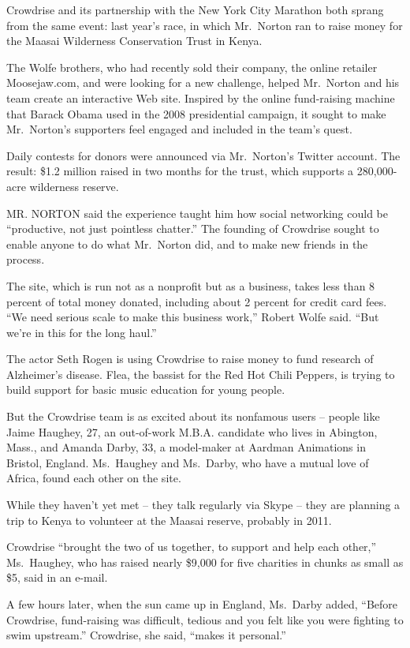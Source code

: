 ﻿\documentclass[12pt]{article}
\begin{document}
Crowdrise and its partnership with the New York City Marathon both sprang from the same event: last
year's race, in which Mr.~Norton ran to raise money for the Maasai Wilderness Conservation Trust in
Kenya.

The Wolfe brothers, who had recently sold their company, the online retailer Moosejaw.com, and were
looking for a new challenge, helped Mr.~Norton and his team create an interactive Web site. Inspired
by the online fund-raising machine that Barack Obama used in the 2008 presidential campaign, it
sought to make Mr.~Norton's supporters feel engaged and included in the team's quest.

Daily contests for donors were announced via Mr.~Norton's Twitter account. The result: \$1.2 million
raised in two months for the trust, which supports a 280,000-acre wilderness reserve.

MR. NORTON said the experience taught him how social networking could be ``productive, not just
pointless chatter.'' The founding of Crowdrise sought to enable anyone to do what Mr.~Norton did,
and to make new friends in the process.

The site, which is run not as a nonprofit but as a business, takes less than 8 percent of total
money donated, including about 2 percent for credit card fees. ``We need serious scale to make this
business work,'' Robert Wolfe said. ``But we're in this for the long haul.''

The actor Seth Rogen is using Crowdrise to raise money to fund research of Alzheimer's disease.
Flea, the bassist for the Red Hot Chili Peppers, is trying to build support for basic music
education for young people.

But the Crowdrise team is as excited about its nonfamous users -- people like Jaime Haughey, 27, an
out-of-work M.B.A. candidate who lives in Abington, Mass., and Amanda Darby, 33, a model-maker at
Aardman Animations in Bristol, England. Ms.~Haughey and Ms.~Darby, who have a mutual love of Africa,
found each other on the site.

While they haven't yet met -- they talk regularly via Skype -- they are planning a trip to Kenya to
volunteer at the Maasai reserve, probably in 2011.

Crowdrise ``brought the two of us together, to support and help each other,'' Ms.~Haughey, who has
raised nearly \$9,000 for five charities in chunks as small as \$5, said in an e-mail.

A few hours later, when the sun came up in England, Ms.~Darby added, ``Before Crowdrise,
fund-raising was difficult, tedious and you felt like you were fighting to swim upstream.''
Crowdrise, she said, ``makes it personal.''
\end{document}
